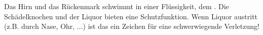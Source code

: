 % 
% 
% 
% 
% 
% 
% 
% 
% 
% 
% 
% 
% 
% 
% 

Das Hirn und das Rückenmark schwimmt in einer
Flüssigkeit, dem . Die
Schädelknochen und der Liquor bieten eine Schutzfunktion. 
Wenn Liquor austritt (z.B. durch Nase, Ohr, ...)  ist das
ein Zeichen für eine schwerwiegende Verletzung!



% 
% 

